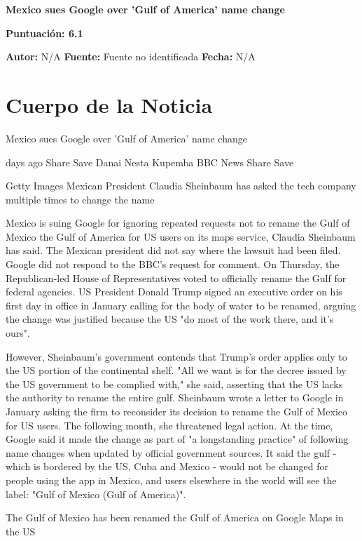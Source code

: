 \documentclass[10pt,a4paper]{article}
\begin{document}
\begin{center}
    {\Huge\bfseries Mexico sues Google over 'Gulf of America' name change\par}
    \vspace{0.5em}
    {\large\bfseries Puntuación: 6.1\par}
\end{center}
\vspace{1em}

\noindent\textbf{Autor:} N/A \hfill \textbf{Fuente:} Fuente no identificada \hfill \textbf{Fecha:} N/A\par
\vspace{1em}

\section*{Cuerpo de la Noticia}
\setlength{\parskip}{1em}
\setlength{\parindent}{0em}
Mexico sues Google over 'Gulf of America' name change
\par{} days ago Share Save Danai Nesta Kupemba BBC News Share Save
\par\medskip
Getty Images Mexican President Claudia Sheinbaum has asked the tech company multiple times to change the name
\par\medskip
Mexico is suing Google for ignoring repeated requests not to rename the Gulf of Mexico the Gulf of America for US users on its maps service, Claudia Sheinbaum has said. The Mexican president did not say where the lawsuit had been filed. Google did not respond to the BBC's request for comment. On Thursday, the Republican-led House of Representatives voted to officially rename the Gulf for federal agencies. US President Donald Trump signed an executive order on his first day in office in January calling for the body of water to be renamed, arguing the change was justified because the US "do most of the work there, and it's ours".
\par\medskip
However, Sheinbaum's government contends that Trump's order applies only to the US portion of the continental shelf. "All we want is for the decree issued by the US government to be complied with," she said, asserting that the US lacks the authority to rename the entire gulf. Sheinbaum wrote a letter to Google in January asking the firm to reconsider its decision to rename the Gulf of Mexico for US users. The following month, she threatened legal action. At the time, Google said it made the change as part of "a longstanding practice" of following name changes when updated by official government sources. It said the gulf - which is bordered by the US, Cuba and Mexico - would not be changed for people using the app in Mexico, and users elsewhere in the world will see the label: "Gulf of Mexico (Gulf of America)".
\par\medskip
The Gulf of Mexico has been renamed the Gulf of America on Google Maps in the US
\vspace{1em}
\end{document}

